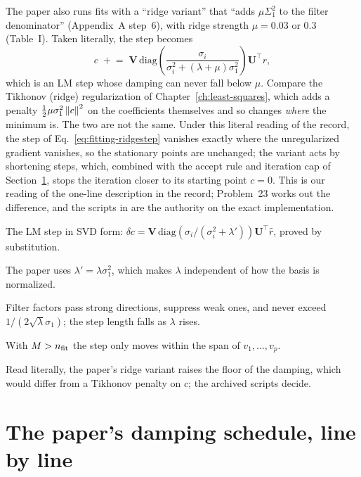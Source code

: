 The paper also runs fits with a ``ridge variant'' that ``adds $\mu\Sigma_1^2$ to the filter denominator'' (Appendix~A step~6), with ridge strength $\mu=0.03$ or $0.3$ (Table~I). Taken literally, the step becomes
\begin{equation}
c\;\mathrel{+}=\;\bm V\,\mathrm{diag}\!\left(\frac{\sigma_i}{\sigma_i^2+(\lambda+\mu)\sigma_1^2}\right)\bm U^\top r ,
\label{eq:fitting-ridgestep}
\end{equation}
which is an LM step whose damping can never fall below $\mu$. Compare the Tikhonov (ridge) regularization of Chapter~\ref{ch:least-squares}, which adds a penalty $\tfrac12\mu\sigma_1^2\left\lVert c\right\rVert^2$ on the coefficients themselves and so changes \emph{where} the minimum is. The two are not the same. Under this literal reading of the record, the step of Eq.~\eqref{eq:fitting-ridgestep} vanishes exactly where the unregularized gradient vanishes, so the stationary points are unchanged; the variant acts by shortening steps, which, combined with the accept rule and iteration cap of Section~\ref{sec:fitting-schedule}, stops the iteration closer to its starting point $c=0$. This is our reading of the one-line description in the record; Problem~23 works out the difference, and the scripts in \cite{zenodo} are the authority on the exact implementation.

\begin{keyideas}
\item The LM step in SVD form: $\delta c=\bm V\,\mathrm{diag}(\sigma_i/(\sigma_i^2+\lambda'))\bm U^\top\hat r$, proved by substitution.
\item The paper uses $\lambda'=\lambda\sigma_1^2$, which makes $\lambda$ independent of how the basis is normalized.
\item Filter factors pass strong directions, suppress weak ones, and never exceed $1/(2\sqrt\lambda\sigma_1)$; the step length falls as $\lambda$ rises.
\item With $M>n_{\rm fit}$ the step only moves within the span of $v_1,\dots,v_p$.
\item Read literally, the paper's ridge variant raises the floor of the damping, which would differ from a Tikhonov penalty on $c$; the archived scripts decide.
\end{keyideas}

\section{The paper's damping schedule, line by line}\label{sec:fitting-schedule}


